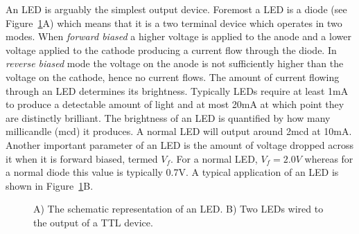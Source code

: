                     An LED is arguably the simplest output device.  Foremost a LED
                    is a diode (see Figure~\ref{fig:commonPeripheralComponentsled}A) which means that it is a
                    two terminal device which operates
                    in two modes.  When \textit{ forward biased} a higher voltage is applied
                    to the anode and a lower voltage applied to the cathode producing a
                    current flow through the diode.  In \textit{ reverse biased} mode the voltage
                    on the anode is not sufficiently higher than the voltage on the cathode,
                    hence no current flows.   The amount of current flowing through an LED
                    determines its brightness.
                    Typically LEDs require at least 1mA to produce a detectable
                    amount of light and at most 20mA at which point they are
                    distinctly brilliant.  The brightness of an LED is
                    quantified by how many millicandle (mcd) it produces.  A normal LED will
                    output around 2mcd at 10mA.  Another important parameter of an LED is the
                    amount of voltage dropped across it when it is forward biased, termed $V_f$.
                    For a normal LED, $V_f=2.0V$ whereas for a normal diode this value is
                    typically 0.7V.  A typical application of an LED is shown in
                    Figure~\ref{fig:commonPeripheralComponentsled}B.

                    \begin{figure}[ht]
                    \caption{A) The schematic representation of an LED.  B) Two LEDs wired
                to the output of a TTL device.}
                \label{fig:commonPeripheralComponentsled}
            \end{figure}

